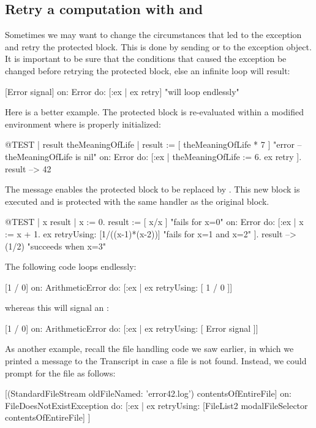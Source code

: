 \documentclass[a4paper,10pt,twoside]{book}
\begin{document}
\subsection{Retry a computation with  and }

Sometimes we may want to change the circumstances that led to the exception and retry the protected block. This is done by sending  or  to the exception object. It is important to be sure that the conditions that caused the exception be changed before retrying the protected block, else an infinite  loop will result:
\begin{code}{}
[Error signal] on: Error do: [:ex | ex retry]    "will loop endlessly"
\end{code}

Here is a better example.
The protected block is re-evaluated within a modified environment where  is properly initialized:
\begin{code}{@TEST | result theMeaningOfLife |}
result := [ theMeaningOfLife * 7 ]    "error -- theMeaningOfLife is nil"
	on: Error
	do: [:ex | theMeaningOfLife := 6. ex retry ].
result --> 42
\end{code}

The message  enables the protected block to be replaced by . This new block is executed and is protected with the same handler as the original block.

\begin{code}{@TEST | x result |}
x := 0.
result := [ x/x ]    "fails for x=0"
	on: Error
	do: [:ex |
		x := x + 1.
		ex retryUsing: [1/((x-1)*(x-2))]    "fails for x=1 and x=2"
	].
result --> (1/2)    "succeeds when x=3"
\end{code}

The following code loops endlessly:
\begin{code}{}
[1 / 0] on: ArithmeticError do: [:ex | ex retryUsing: [ 1 / 0 ]]
\end{code}
whereas this will signal an : 
\begin{code}{}
[1 / 0] on: ArithmeticError do: [:ex | ex retryUsing: [ Error signal ]]
\end{code}

As another example, recall the file handling code we saw earlier, in which we printed a message to the Transcript in case a file is not found. Instead, we could prompt for the file as follows:
\begin{code}{}
[(StandardFileStream oldFileNamed: 'error42.log') contentsOfEntireFile]
	on: FileDoesNotExistException
	do: [:ex | ex retryUsing: [FileList2 modalFileSelector contentsOfEntireFile] ]
\end{code}
\end{document}
